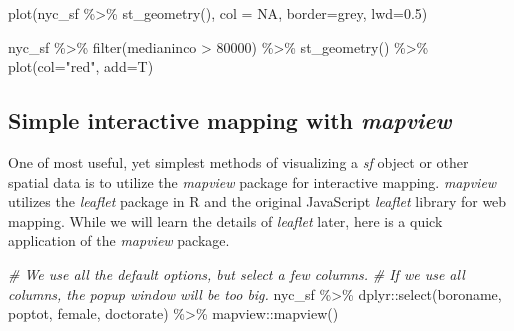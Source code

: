 \documentclass[
  11pt,
]{book}
\newenvironment{Shaded}{\begin{snugshade}}{\end{snugshade}}
\newcommand{\AttributeTok}[1]{\textcolor[rgb]{0.77,0.63,0.00}{#1}}
\newcommand{\CommentTok}[1]{\textcolor[rgb]{0.56,0.35,0.01}{\textit{#1}}}
\newcommand{\DecValTok}[1]{\textcolor[rgb]{0.00,0.00,0.81}{#1}}
\newcommand{\FloatTok}[1]{\textcolor[rgb]{0.00,0.00,0.81}{#1}}
\newcommand{\FunctionTok}[1]{\textcolor[rgb]{0.00,0.00,0.00}{#1}}
\newcommand{\NormalTok}[1]{#1}
\newcommand{\SpecialCharTok}[1]{\textcolor[rgb]{0.00,0.00,0.00}{#1}}
\newcommand{\StringTok}[1]{\textcolor[rgb]{0.31,0.60,0.02}{#1}}
\begin{document}
\begin{Shaded}
\begin{Highlighting}[]
\FunctionTok{plot}\NormalTok{(nyc\_sf }\SpecialCharTok{\%\textgreater{}\%} \FunctionTok{st\_geometry}\NormalTok{(), }\AttributeTok{col =} \StringTok{\textquotesingle{}NA\textquotesingle{}}\NormalTok{, }\AttributeTok{border=}\StringTok{\textquotesingle{}grey\textquotesingle{}}\NormalTok{, }\AttributeTok{lwd=}\FloatTok{0.5}\NormalTok{)}

\NormalTok{nyc\_sf }\SpecialCharTok{\%\textgreater{}\%} 
  \FunctionTok{filter}\NormalTok{(medianinco }\SpecialCharTok{\textgreater{}} \DecValTok{80000}\NormalTok{) }\SpecialCharTok{\%\textgreater{}\%} 
  \FunctionTok{st\_geometry}\NormalTok{() }\SpecialCharTok{\%\textgreater{}\%} 
  \FunctionTok{plot}\NormalTok{(}\AttributeTok{col=}\StringTok{"red"}\NormalTok{, }\AttributeTok{add=}\NormalTok{T)}
\end{Highlighting}
\end{Shaded}

\hypertarget{simple-interactive-mapping-with-mapview}{%
\subsection{\texorpdfstring{Simple interactive mapping with \emph{mapview}}{Simple interactive mapping with mapview}}\label{simple-interactive-mapping-with-mapview}}

One of most useful, yet simplest methods of visualizing a \emph{sf} object or other spatial data is to utilize the \emph{mapview} package for interactive mapping. \emph{mapview} utilizes the \emph{leaflet} package in R and the original JavaScript \emph{leaflet} library for web mapping. While we will learn the details of \emph{leaflet} later, here is a quick application of the \emph{mapview} package.

\begin{Shaded}
\begin{Highlighting}[]
\CommentTok{\# We use all the default options, but select a few columns. }
\CommentTok{\# If we use all columns, the popup window will be too big. }
\NormalTok{nyc\_sf }\SpecialCharTok{\%\textgreater{}\%}\NormalTok{ dplyr}\SpecialCharTok{::}\FunctionTok{select}\NormalTok{(boroname, poptot, female, doctorate) }\SpecialCharTok{\%\textgreater{}\%}
\NormalTok{  mapview}\SpecialCharTok{::}\FunctionTok{mapview}\NormalTok{()}
\end{Highlighting}
\end{Shaded}
\end{document}
